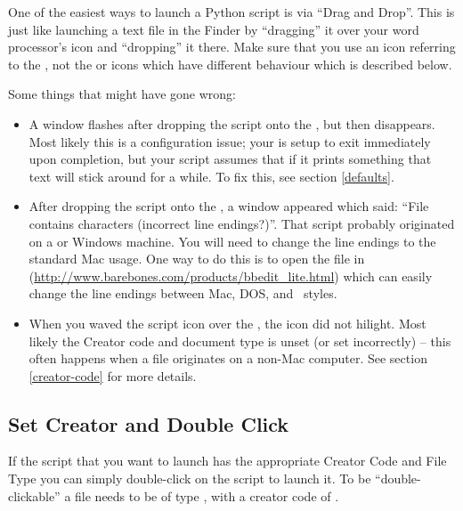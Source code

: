 One of the easiest ways to launch a Python script is via ``Drag and
Drop''. This is just like launching a text file in the Finder by
``dragging'' it over your word processor's icon and ``dropping'' it
there. Make sure that you use an icon referring to the
, not the  or 
icons which have different behaviour which is described below.

Some things that might have gone wrong:

\begin{itemize}
\item
A window flashes after dropping the script onto the
, but then disappears. Most likely this is a
configuration issue; your  is setup to exit
immediately upon completion, but your script assumes that if it prints
something that text will stick around for a while. To fix this, see
section \ref{defaults}.

\item
After dropping the script onto the , a
window appeared which said: ``File contains  characters
(incorrect line endings?)''. That script probably originated on a
\UNIX{} or Windows machine. You will need to change the line endings
to the standard Mac usage.  One way to do this is to open the file in
(\url{http://www.barebones.com/products/bbedit_lite.html}) which can
easily change the line endings between Mac, DOS, and \UNIX\ styles.

\item
When you waved the script icon over the ,
the  icon did not hilight.  Most likely the
Creator code and document type is unset (or set incorrectly) -- this
often happens when a file originates on a non-Mac computer.  See
section \ref{creator-code} for more details.
\end{itemize}


\subsection{Set Creator and Double Click \label{creator-code}}

If the script that you want to launch has the appropriate Creator Code
and File Type you can simply double-click on the script to launch it.
To be ``double-clickable'' a file needs to be of type ,
with a creator code of .


